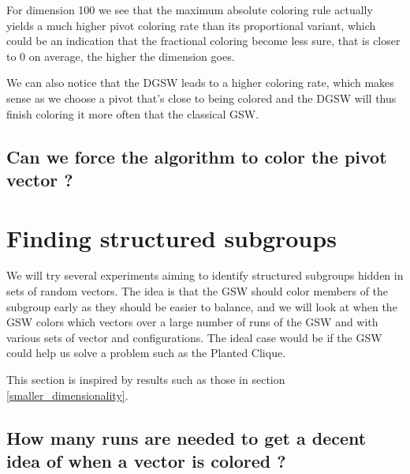\documentclass[12pt]{article}
\begin{document}
For dimension 100 we see that the maximum absolute coloring rule actually yields a much higher pivot coloring rate than its proportional variant, which could be an indication that the fractional coloring become less sure, that is closer to 0 on average, the higher the dimension goes.

We can also notice that the DGSW leads to a higher coloring rate, which makes sense as we choose a pivot that's close to being colored and the DGSW will thus finish coloring it more often that the classical GSW.
\subsection{Can we force the algorithm to color the pivot vector ?}
\section{Finding structured subgroups}
We will try several experiments aiming to identify structured subgroups hidden in sets of random vectors. The idea is that the GSW should color members of the subgroup early as they should be easier to balance, and we will look at when the GSW colors which vectors over a large number of runs of the GSW and with various sets of vector and configurations. The ideal case would be if the GSW could help us solve a problem such as the Planted Clique.

This section is inspired by results such as those in section \ref{smaller_dimensionality}.

\subsection{How many runs are needed to get a decent idea of when a vector is colored ?}
\newpage


\newpage
\nocite{*}



\end{document}

